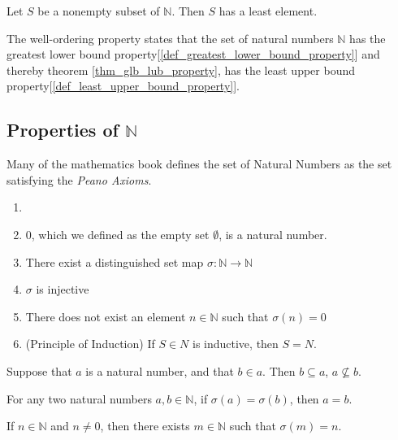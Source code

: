 \documentclass{report}
\begin{document}
		\begin{thm} \label{thm_well_ordering_property}
			Let $S$ be a nonempty subset of $\mathbb{N}$. Then $S$ has a least element.
		\end{thm}
		
		\begin{note}
			The well-ordering property states that the set of natural numbers $\mathbb{N}$ has the greatest lower bound property[\ref{def_greatest_lower_bound_property}] and thereby theorem \ref{thm_glb_lub_property}, has the least upper bound property[\ref{def_least_upper_bound_property}].
		\end{note}
		
		\subsection{Properties of $\mathbb{N}$}
		Many of the mathematics book defines the set of Natural Numbers as the set satisfying the \emph{Peano Axioms}.
		\begin{prop} \label{peano_axioms} \label{thm_property_N}
			\begin{enumerate}
				\item[]
				\item $0$, which we defined as the empty set $\emptyset$, is a natural number.
				\item There exist a distinguished set map $\sigma: \mathbb{N} \rightarrow \mathbb{N}$
				\item $\sigma$ is injective
				\item There does not exist an element $n \in \mathbb{N}$ such that $\sigma(n)=0$
				\item (Principle of Induction) If $S \in N$ is inductive, then $S=N$.
			\end{enumerate}
		\end{prop}
		
		\begin{prop}
			Suppose that $a$ is a natural number, and that $b \in a$. Then $b \subseteq a$, $a \nsubseteq b$.
		\end{prop}
		
		\begin{prop}
			For any two natural numbers $a,b\in \mathbb{N}$, if $\sigma(a)=\sigma(b)$, then $a=b$.
		\end{prop}
		
		\begin{lemma}
			If $n \in \mathbb{N}$ and $n \ne 0$, then there exists $m \in \mathbb{N}$ such that $\sigma(m)=n$.
		\end{lemma}
	
\end{document}

